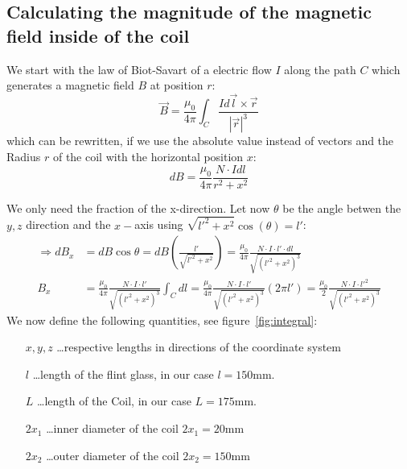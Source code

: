\subsection{Calculating the magnitude of the magnetic field inside of the coil}
We start with the law of Biot-Savart of a electric flow $I$ along the path $C$ which generates
a magnetic field $B$ at position $r$:
\begin{equation}
    \vec{B} = \frac{\mu_0}{4\pi} \int_{C} \frac{I d\vec{l} \times \vec{r}}{|\vec{r}|^3} 
\end{equation}
which can be rewritten, if we use the absolute value instead of vectors and the Radius $r$ of the
coil with the horizontal position $x$:
\begin{equation}
    dB = \frac{\mu_0}{4\pi} \frac{N \cdot I dl}{r^2 + x^2} 
\end{equation}

We only need the fraction of the x-direction. Let now $\theta$ be the angle betwen the $y,z$ 
direction and the $x-$axis using $\sqrt{{l'}^2 + x^2} \cos(\theta) = {l'}$:
\begin{align}
    \Rightarrow dB_x &= dB \cos\theta = dB \left (\frac{{l'}}{\sqrt{{l'}^2 + x^2}} \right) = 
    \frac{\mu_0}{4\pi} \frac{N\cdot I  \cdot {l'} \cdot dl}{\sqrt{\left ({l'}^2 + x^2 \right )^3}} \\
    B_x &= \frac{\mu_0}{4\pi} \frac{N\cdot I  \cdot {l'}}{\sqrt{\left ({l'}^2 + x^2 \right )^3}} \int_C dl 
  = \frac{\mu_0}{4\pi} \frac{N\cdot I  \cdot {l'}}{\sqrt{\left ({l'}^2 + x^2 \right )^3}} \left (2\pi {l'} \right )
  =  \frac{\mu_0}{2} \frac{N\cdot I  \cdot {l'}^2}{\sqrt{\left ({l'}^2 + x^2 \right )^3}} 
\end{align}
We now define the following quantities, see figure~\ref{fig:integral}: 
\begin{itemize}
\setlength\itemsep{0.0mm}
    \item[$x,y,z$] \ldots respective lengths in directions of the coordinate system 
    \item[$l$]     \ldots length of the flint glass, in our case $l=150$mm.
    \item[$L$]     \ldots length of the Coil, in our case $L=175$mm.
    \item[$2x_1$]  \ldots inner diameter of the coil $2x_1=20$mm
    \item[$2x_2$]  \ldots outer diameter of the coil $2x_2=150$mm 
\end{itemize}


